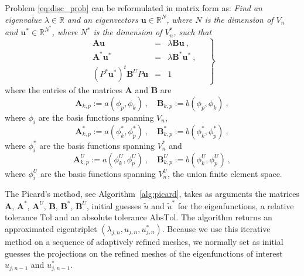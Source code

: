 \documentclass[preprint,12pt]{elsarticle}
\begin{document}
Problem \eqref{eq:disc_prob} can be reformulated in matrix form as:
\emph{Find an eigenvalue $\lambda\in \mathbb{R}$ and an eigenvectors $\mathbf{u}\in \mathbb{R}^N$, where $N$ is the dimension of $V_n$ and $\mathbf{u}^*\in \mathbb{R}^{N^*}$, where $N^*$ is the dimension of $V_n^*$,
such that}
\begin{equation}
\label{eq:disc_prob_mat}
\left.
\begin{array}{lcl}
\mathbf{A} \mathbf{u}&=& \lambda\mathbf{B}\mathbf{u}\ ,
\\
\mathbf{A}^* \mathbf{u}^*&=& \lambda\mathbf{B}^*\mathbf{u}^*\ ,
\\
(P^*\mathbf{u}^*)^t\mathbf{B}^U P\mathbf{u} &=& 1
\end{array}\quad
\right\}
\end{equation}
where the entries of the matrices $\mathbf{A}$ and $\mathbf{B}$ are 
$$
\mathbf{A}_{k,p}:=a(\phi_p,\phi_k)\ ,\quad\mathbf{B}_{k,p}:=b(\phi_p,\phi_k)\ ,
$$
where $\phi_i$ are the basis functions spanning $V_n$,
$$
\mathbf{A}^*_{k,p}:=a(\phi_k^*,\phi_p^*)\ ,\quad\mathbf{B}^*_{k,p}:=b(\phi_k^*,\phi_p^*)\ ,
$$
where $\phi_i^*$ are the basis functions spanning $V_n^*$ and
$$
\mathbf{A}^U_{k,p}:=a(\phi_k^U,\phi_p^U)\ ,\quad\mathbf{B}^U_{k,p}:=b(\phi_k^U,\phi_p^U)\ ,
$$
where $\phi_i^U$ are the basis functions spanning $V_n^U$, the union finite element space.



The Picard's method, see Algorithm~\ref{alg:picard}, takes as arguments the matrices $\mathbf{A}$, $\mathbf{A}^*$, $\mathbf{A}^U$, $\mathbf{B}$, $\mathbf{B}^*$, $\mathbf{B}^U$, initial guesses $\tilde u$ and $\tilde u^*$ for the eigenfunctions, a relative tolerance $\mathrm{Tol}$ and an absolute tolerance $\mathrm{AbsTol}$. 
The algorithm returns an approximated eigentriplet $(\lambda_{j,n},u_{j,n},u_{j,n}^*)$.
Because we use this iterative method on a sequence of adaptively refined meshes, we normally set as initial guesses
the projections on the refined meshes of the eigenfunctions of interest $u_{j,n-1}$ and $u_{j,n-1}^*$.
\end{document}
